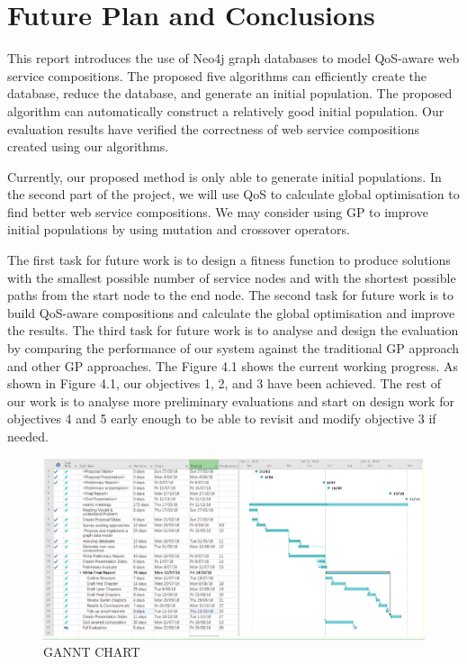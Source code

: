 \chapter{Future Plan and Conclusions}\label{C:con}

This report introduces the use of Neo4j graph databases to model QoS-aware web service compositions. The proposed five algorithms can efficiently create the database, reduce the database, and generate an initial population. The proposed algorithm can automatically construct a relatively good initial population. Our evaluation results have verified the correctness of web service compositions created using our algorithms.

Currently, our proposed method is only able to generate initial populations. In the second part of the project, we will use QoS to calculate global optimisation to find better web service compositions. We may consider using GP to improve initial populations by using mutation and crossover operators.

The first task for future work is to design a fitness function to produce solutions with the smallest possible number of service nodes and with the shortest possible paths from the start node to the end node. The second task for future work is to build QoS-aware compositions and calculate the global optimisation and improve the results. The third task for future work is to analyse and design the evaluation by comparing the performance of our system against the traditional GP approach and other GP approaches.  The Figure 4.1 shows the current working progress. As shown in Figure 4.1, our objectives 1, 2, and 3 have been achieved. The rest of our work is to analyse more preliminary evaluations and start on design work for objectives 4 and 5 early enough to be able to revisit and modify objective 3 if needed.\\

\begin{figure}[h]
\includegraphics[width=15cm]{ganttChart.png}
\centering
\caption{GANNT CHART}
\end{figure}

